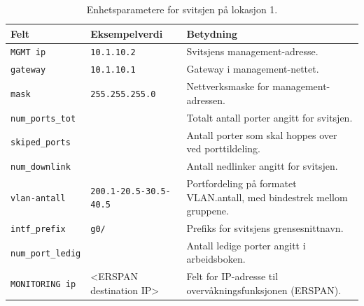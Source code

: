 \begin{table}[H]
    \centering
    \caption{Enhetsparametere for svitsjen på lokasjon 1.}
    \label{tab:excel-svitsj-enhet}
    \small
    \renewcommand{\arraystretch}{1.35}
    \setlength{\tabcolsep}{5pt}
    \begin{tabular}{
        >{\raggedright\arraybackslash}p{4.4cm}
        >{\raggedright\arraybackslash}p{4.6cm}
        >{\raggedright\arraybackslash}p{5.2cm}
    }
        \toprule
        \rowcolor{tablegreen}
        \color{white}\textbf{Felt} &
        \color{white}\textbf{Eksempelverdi} &
        \color{white}\textbf{Betydning} \\
        \midrule

        \texttt{MGMT ip} &
        \texttt{10.1.10.2} &
        Svitsjens management-adresse. \\

        \texttt{gateway} &
        \texttt{10.1.10.1} &
        Gateway i management-nettet. \\

        \texttt{mask} &
        \texttt{255.255.255.0} &
        Nettverksmaske for management-adressen. \\

        \texttt{num\_ports\_tot} &
        25 &
        Totalt antall porter angitt for svitsjen. \\

        \texttt{skiped\_ports} &
        1 &
        Antall porter som skal hoppes over ved porttildeling. \\

        \texttt{num\_downlink} &
        0 &
        Antall nedlinker angitt for svitsjen. \\

        \texttt{vlan-antall} &
        \texttt{200.1-20.5-30.5-40.5} &
        Portfordeling på formatet VLAN.antall, med bindestrek mellom gruppene. \\

        \texttt{intf\_prefix} &
        \texttt{g0/} &
        Prefiks for svitsjens grensesnittnavn. \\

        \texttt{num\_port\_ledig} &
        21 &
        Antall ledige porter angitt i arbeidsboken. \\

        \texttt{MONITORING ip} &
        <ERSPAN destination IP> &
        Felt for IP-adresse til overvåkningsfunksjonen (ERSPAN). \\


\end{tabular}
\end{table}
